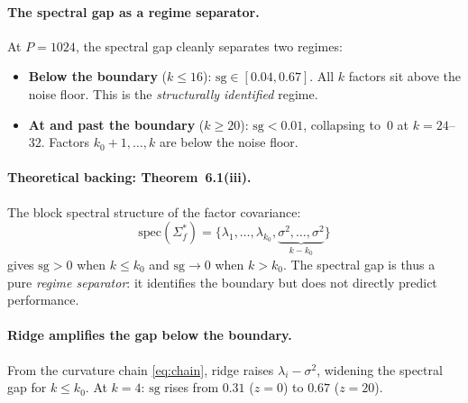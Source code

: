 \documentclass[11pt,a4paper]{article}
\begin{document}
\paragraph{The spectral gap as a regime separator.}
At $P = 1024$, the spectral gap cleanly separates two regimes:
\begin{itemize}[nosep]
  \item \textbf{Below the boundary} ($k \leq 16$): $\mathrm{sg} \in [0.04, 0.67]$.  All $k$ factors sit above the noise floor.  This is the \emph{structurally identified} regime.
  \item \textbf{At and past the boundary} ($k \geq 20$): $\mathrm{sg} < 0.01$, collapsing to~$0$ at $k = 24$--$32$.  Factors $k_0 + 1, \ldots, k$ are below the noise floor.
\end{itemize}

\paragraph{Theoretical backing: Theorem~6.1(iii).}
The block spectral structure of the factor covariance:
\[
  \mathrm{spec}(\Sigma^*_f) = \bigl\{\lambda_1, \ldots, \lambda_{k_0}, \underbrace{\sigma^2, \ldots, \sigma^2}_{k-k_0}\bigr\}
\]
gives $\mathrm{sg} > 0$ when $k \leq k_0$ and $\mathrm{sg} \to 0$ when $k > k_0$.  The spectral gap is thus a pure \emph{regime separator}: it identifies the boundary but does not directly predict performance.

\paragraph{Ridge amplifies the gap below the boundary.}
From the curvature chain \eqref{eq:chain}, ridge raises $\lambda_i - \sigma^2$, widening the spectral gap for $k \leq k_0$.  At $k = 4$: $\mathrm{sg}$ rises from $0.31$ ($z = 0$) to $0.67$ ($z = 20$).
\end{document}
